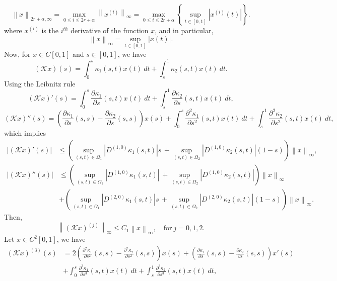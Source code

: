 \documentclass[pdflatex, sn-mathphys-num]{sn-jnl}%
\newcommand{\norm}[1]{\left\lVert #1\right\rVert}
\theoremstyle{thmstyleone}%
\theoremstyle{thmstyletwo}%
\theoremstyle{thmstylethree}%
\begin{document}
\begin{equation*}
	\norm{x}_{2r + \alpha, \infty} = \max_{0 \leq i \leq 2r +\alpha} \norm{x^{(i)}}_\infty = \max_{0 \leq i \leq 2r +\alpha} \left\{ \sup_{t \in [0,1]}  \left|x^{(i)}(t)\right| \right\}.
\end{equation*}   
where $x^{(i)}$ is the $i^{th}$ derivative of the function $x$, and
in particular, 
\[
\norm{x}_\infty =  \sup_{t \in [0,1]}  \left|x(t)\right|.
\]
Now, for $x \in C[0,1]$ and $s \in [0,1]$, we have
\[
(\mathcal{K}x)(s) =  \int_{0}^{s} \kappa_1(s, t) x(t)~dt + \int_{s}^{1} \kappa_2(s, t) x(t)~dt.
\]
Using the Leibnitz rule
\begin{equation*}
	(\mathcal{K}x)'(s) = \int_{0}^{s} \frac{\partial \kappa_1}{\partial s}(s, t) x(t)~dt + \int_{s}^{1} \frac{\partial \kappa_2}{\partial s}(s, t) x(t)~dt,
\end{equation*}
\begin{equation*}
	(\mathcal{K}x)''(s) =  \left( \frac{\partial \kappa_1}{\partial s}(s, s) - \frac{\partial \kappa_2}{\partial s}(s, s) \right) x(s) + \int_{0}^{s} \frac{\partial^2 \kappa_1}{\partial s^2}(s, t) x(t)~dt + \int_{s}^{1} \frac{\partial^2 \kappa_2}{\partial s^2}(s, t) x(t)~dt,
\end{equation*}
 which implies
\begin{align*}
	| (\mathcal{K}x)'(s) | &\leq \left( \sup_{(s,t) \in \Omega_1} \left| D^{(1,0)} \kappa_1(s,t) \right|   s  \, + \sup_{(s,t) \in \Omega_2} \left| D^{(1,0)} \kappa_2(s,t) \right| (1-s) \right)  \norm{x}_\infty,
\end{align*}
\begin{align*}
	| (\mathcal{K}x)''(s) | &\leq \left( \sup_{(s,t) \in \Omega_1} \left| D^{(1,0)} \kappa_1(s,t) \right| \, + \sup_{(s,t) \in \Omega_2} \left| D^{(1,0)} \kappa_2(s,t) \right|  \right) \norm{x}_\infty \\
	& + \left( \sup_{(s,t) \in \Omega_1} \left| D^{(2,0)} \kappa_1(s,t) \right|   s  \, + \sup_{(s,t) \in \Omega_2} \left| D^{(2,0)} \kappa_2(s,t) \right| (1-s) \right)  \norm{x}_\infty.
\end{align*}
Then, 
\begin{equation} \label{Eq: 004}
	\norm{(\mathcal{K}x)^{(j)}}_\infty \leq C_1 \norm{x}_\infty, \quad \text{for}~ j=0,1,2.
\end{equation}
Let $x \in C^2[0,1]$, we have
\begin{align*}
	(\mathcal{K}x)^{(3)}(s) &=  2 \left( \frac{\partial^2 \kappa_1}{\partial s^2}(s, s) - \frac{\partial^2 \kappa_2}{\partial s^2}(s, s) \right) x(s) + \left( \frac{\partial \kappa_1}{\partial s}(s, s) - \frac{\partial \kappa_2}{\partial s}(s, s) \right) x'(s) \\ 
	&+ \int_{0}^{s} \frac{\partial^3 \kappa_1}{\partial s^3}(s, t) x(t)~dt + \int_{s}^{1} \frac{\partial^3 \kappa_2}{\partial s^3}(s, t) x(t)~dt,
\end{align*}
\end{document}
